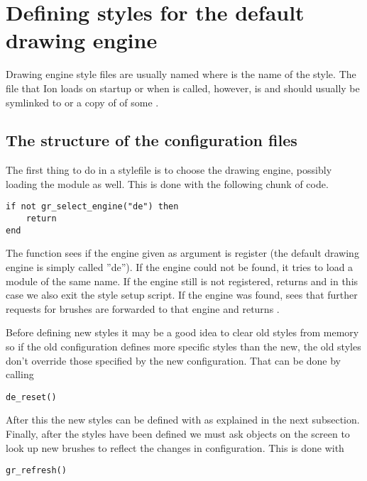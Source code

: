 \section{Defining styles for the default drawing engine}
\label{sec:defaultde}

Drawing engine style files are usually named
 where  is the name of the
style. The file that Ion loads on startup or when
 is called, however, is 
and should usually be symlinked to or a copy of of some
.

\subsection{The structure of the configuration files}

The first thing to do in a stylefile is to choose the drawing
engine, possibly loading the module as well. This is done
with the following chunk of code.

\begin{verbatim}
if not gr_select_engine("de") then 
    return 
end
\end{verbatim}

The  function sees if the engine
given as argument is register (the default drawing engine is
simply called ''de''). If the engine could not be found, it
tries to load a module of the same name. If the engine still
is not registered,  returns 
and in this case we also exit the style setup script.
If the engine was found,  sees that
further requests for brushes are forwarded to that engine
and returns .

Before defining new styles it may be a good idea to clear old
styles from memory so if the old configuration defines more
specific styles than the new, the old styles don't override 
those specified by the new configuration. That can be done by
calling

\begin{verbatim}
de_reset()
\end{verbatim}

After this the new styles can be defined with 
as explained in the next subsection. Finally, after the styles have
been defined we must ask objects on the screen to look up new brushes
to reflect the changes in configuration. This is done with

\begin{verbatim}
gr_refresh()
\end{verbatim}

